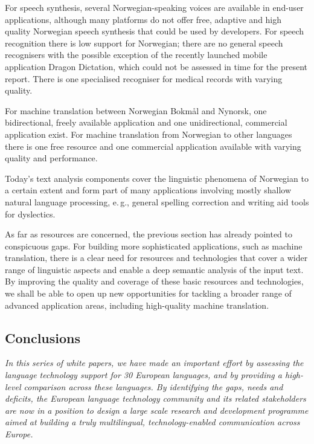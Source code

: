 \begin{multicols}{2}
For speech synthesis, several Norwegian-speaking voices are available in end-user applications, although many platforms do not offer free, adaptive and high quality Norwegian speech synthesis that could be used by developers. 
For speech recognition there is low support for Norwegian; there are no general speech recognisers with the possible exception of the recently launched mobile application Dragon Dictation, which could not be assessed in time for the present report.
There is one specialised recogniser for medical records with varying quality.

For machine translation between Norwegian Bokmål and Nynorsk, one bidirectional, freely available application and one unidirectional, commercial application exist. 
For machine translation from Norwegian to other languages there is one free resource and one commercial application available with varying quality and performance. 

Today’s text analysis components cover the linguistic phenomena of
Norwegian to a certain extent and form part of many applications
involving mostly shallow natural language processing, e.\,g., general spelling correction and writing aid tools for dyslectics. 

As far as resources are concerned, the previous section has already pointed to conspicuous gaps.
For building more sophisticated applications, such as machine translation, there is a clear need for resources and technologies that cover a wider range of linguistic aspects and enable a deep semantic analysis of the input text. By improving the quality and coverage of these basic resources and technologies, we shall be able to open up new opportunities for tackling a broader range of advanced application areas, including high-quality machine translation.

\subsection{Conclusions}

\emph{In this series of white papers, we have made an important effort by assessing the language technology support for 30 European languages, and by providing a high-level comparison across these languages. By identifying the gaps, needs and deficits, the European language technology community and its related stakeholders are now in a position to design a large scale research and development programme aimed at building a truly multilingual, technology-enabled communication across Europe.}


\end{multicols}
